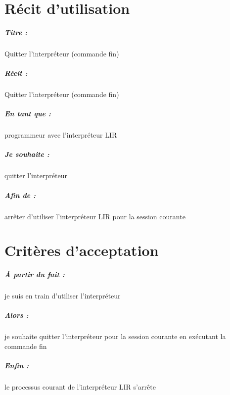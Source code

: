 \documentclass[12pt,a5paper, notitle, oneside]{report}
\begin{document}
    \chapter*{Récit d'utilisation}

    \paragraph{Titre : } Quitter l'interpréteur (commande fin)
    \paragraph{Récit : } Quitter l'interpréteur (commande fin)
    \paragraph{En tant que : } programmeur avec l'interpréteur LIR
    \paragraph{Je souhaite : } quitter l'interpréteur
    \paragraph{Afin de : } arrêter d'utiliser l'interpréteur LIR pour la session courante
    \newpage

    \chapter*{Critères d'acceptation}

    \paragraph{À partir du fait : } je suis en train d'utiliser l'interpréteur
    \paragraph{Alors : } je souhaite quitter l'interpréteur pour la session courante en exécutant la commande fin
    \paragraph{Enfin : } le processus courant de l'interpréteur LIR s'arrête
\end{document}
